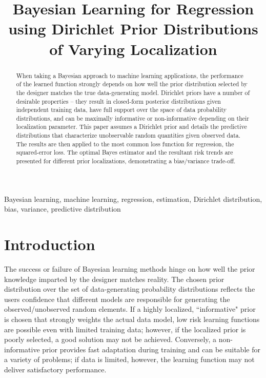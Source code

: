 \documentclass{article}
\title{Bayesian Learning for Regression using Dirichlet Prior Distributions of Varying Localization}
\begin{document}
\maketitle


\begin{abstract}
When taking a Bayesian approach to machine learning applications, the performance of the learned function strongly depends on how well the prior distribution selected by the designer matches the true data-generating model. Dirichlet priors have a number of desirable properties -- they result in closed-form posterior distributions given independent training data, have full support over the space of data probability distributions, and can be maximally informative or non-informative depending on their localization parameter. This paper assumes a Dirichlet prior and details the predictive distributions that characterize unobservable random quantities given observed data. The results are then applied to the most common loss function for regression, the squared-error loss. The optimal Bayes estimator and the resultant risk trends are presented for different prior localizations, demonstrating a bias/variance trade-off. 
\end{abstract}

\begin{keywords}
Bayesian learning, machine learning, regression, estimation, Dirichlet distribution, bias, variance, predictive distribution
\end{keywords}



\section{Introduction}

The success or failure of Bayesian learning methods hinge on how well the prior knowledge imparted by the designer matches reality. The chosen prior distribution over the set of data-generating probability distributions reflects the users confidence that different models are responsible for generating the observed/unobserved random elements. If a highly localized, ``informative" prior is chosen that strongly weights the actual data model, low risk learning functions are possible even with limited training data; however, if the localized prior is poorly selected, a good solution may not be achieved. Conversely, a non-informative prior provides fast adaptation during training and can be suitable for a variety of problems; if data is limited, however, the learning function may not deliver satisfactory performance.
\end{document}
